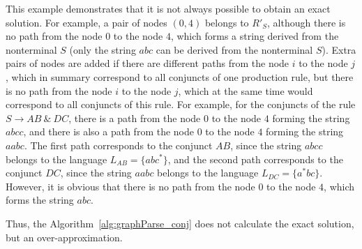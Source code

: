 This example demonstrates that it is not always possible to obtain an exact solution. For example, a pair of nodes $(0,4)$ belongs to $R'_S$, although there is no path from the node $0$ to the node $4$, which forms a string derived from the nonterminal $S$ (only the string $abc$ can be derived from the nonterminal $S$). Extra pairs of nodes are added if there are different paths from the node $i$ to the node $j$, which in summary correspond to all conjuncts of one production rule, but there is no path from the node $i$ to the node $j$, which at the same time would correspond to all conjuncts of this rule. For example, for the conjuncts of the rule $S \rightarrow AB \ \& \ DC$, there is a path from the node $0$ to the node $4$ forming the string $abcc$, and there is also a path from the node $0$ to the node $4$ forming the string $aabc$. The first path corresponds to the conjunct $AB$, since the string $abcc$ belongs to the language $L_{AB} = \{abc^*\}$, and the second path corresponds to the conjunct $DC$, since the string $aabc$ belongs to the language $L_{DC} = \{a^*bc\}$. However, it is obvious that there is no path from the node $0$ to the node $4$, which forms the string $abc$.

Thus, the Algorithm~\ref{alg:graphParse_conj} does not calculate the exact solution, but an over-approximation.